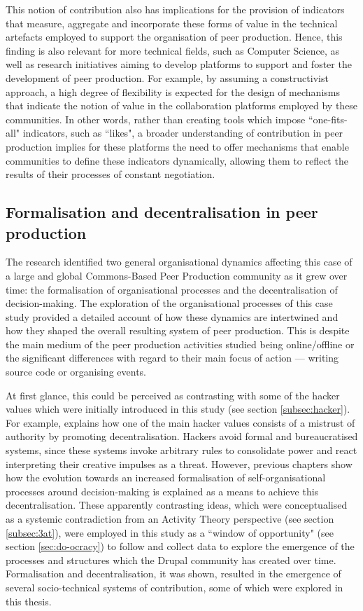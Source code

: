 This notion of contribution also has implications for the provision of indicators that measure, aggregate and incorporate these forms of value in the technical artefacts employed to support the organisation of peer production. Hence, this finding is also relevant for more technical fields, such as Computer Science, as well as research initiatives \parencite[e.g.][]{CAPS:2017:Online} aiming to develop platforms to support and foster the development of peer production. For example, by assuming a constructivist approach, a high degree of flexibility is expected for the design of mechanisms that indicate the notion of value in the collaboration platforms employed by these communities. In other words, rather than creating tools which impose ``one-fits-all" indicators, such as ``likes", a broader understanding of contribution in peer production implies for these platforms the need to offer mechanisms that enable communities to define these indicators dynamically, allowing them to reflect the results of their processes of constant negotiation.

\subsection{Formalisation and decentralisation in peer production}

The research identified two general organisational dynamics affecting this case of a large and global Commons-Based Peer Production community as it grew over time: the formalisation of organisational processes and the decentralisation of decision-making. The exploration of the organisational processes of this case study provided a detailed account of how these dynamics are intertwined and how they shaped the overall resulting system of peer production. This is despite the main medium of the peer production activities studied being online/offline or the significant differences with regard to their main focus of action --- writing source code or organising events.

At first glance, this could be perceived as contrasting with some of the hacker values which were initially introduced in this study (see section \ref{subsec:hacker}). For example, \textcite[34-35]{levy1984hackers} explains how one of the main hacker values consists of a mistrust of authority by promoting decentralisation. Hackers avoid formal and bureaucratised systems, since these systems invoke arbitrary rules to consolidate power and react interpreting their creative impulses as a threat. However, previous chapters show how the evolution towards an increased formalisation of self-organisational processes around decision-making is explained as a means to achieve this decentralisation. These apparently contrasting ideas, which were conceptualised as a systemic contradiction from an Activity Theory perspective (see section \ref{subsec:3at}), were employed in this study as  a ``window of opportunity" (see section \ref{sec:do-ocracy}) to follow and collect data to explore the emergence of the processes and structures which the Drupal community has created over time. Formalisation and decentralisation, it was shown, resulted in the emergence of several socio-technical systems of contribution, some of which were explored in this thesis.

